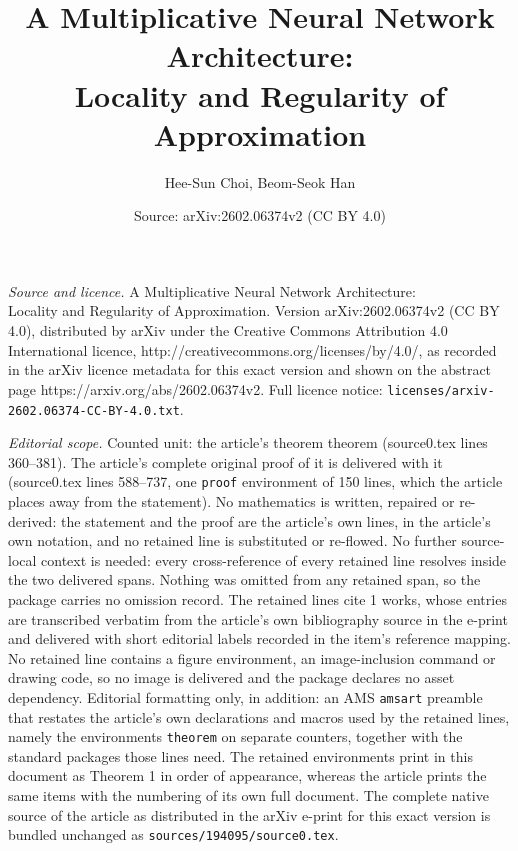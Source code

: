 \documentclass[10pt,a4paper]{amsart}
\title{A Multiplicative Neural Network Architecture:\\ Locality and Regularity of Approximation}
\author{Hee-Sun Choi, Beom-Seok Han}
\date{Source: arXiv:2602.06374v2 (CC BY 4.0)}
\begin{document}
\maketitle

\noindent\emph{Source and licence.} A Multiplicative Neural Network Architecture:\\ Locality and Regularity of Approximation. Version arXiv:2602.06374v2 (CC BY 4.0), distributed by arXiv under the Creative Commons Attribution 4.0 International licence, http://creativecommons.org/licenses/by/4.0/, as recorded in the arXiv licence metadata for this exact version and shown on the abstract page https://arxiv.org/abs/2602.06374v2. Full licence notice: \texttt{licenses/arxiv-2602.06374-CC-BY-4.0.txt}.\par\smallskip

\noindent\textit{Editorial scope.} Counted unit: the article's theorem theorem (source0.tex lines 360--381). The article's complete original proof of it is delivered with it (source0.tex lines 588--737, one \texttt{proof} environment of 150 lines, which the article places away from the statement). No mathematics is written, repaired or re-derived: the statement and the proof are the article's own lines, in the article's own notation, and no retained line is substituted or re-flowed.  No further source-local context is needed: every cross-reference of every retained line resolves inside the two delivered spans.  Nothing was omitted from any retained span, so the package carries no omission record.  The retained lines cite 1 works, whose entries are transcribed verbatim from the article's own bibliography source in the e-print and delivered with short editorial labels recorded in the item's reference mapping.  No retained line contains a figure environment, an image-inclusion command or drawing code, so no image is delivered and the package declares no asset dependency.  Editorial formatting only, in addition: an AMS \texttt{amsart} preamble that restates the article's own declarations and macros used by the retained lines, namely the environments \texttt{theorem} on separate counters, together with the standard packages those lines need.  The retained environments print in this document as Theorem 1 in order of appearance, whereas the article prints the same items with the numbering of its own full document.  The complete native source of the article as distributed in the arXiv e-print for this exact version is bundled unchanged as \texttt{sources/194095/source0.tex}.
\end{document}
